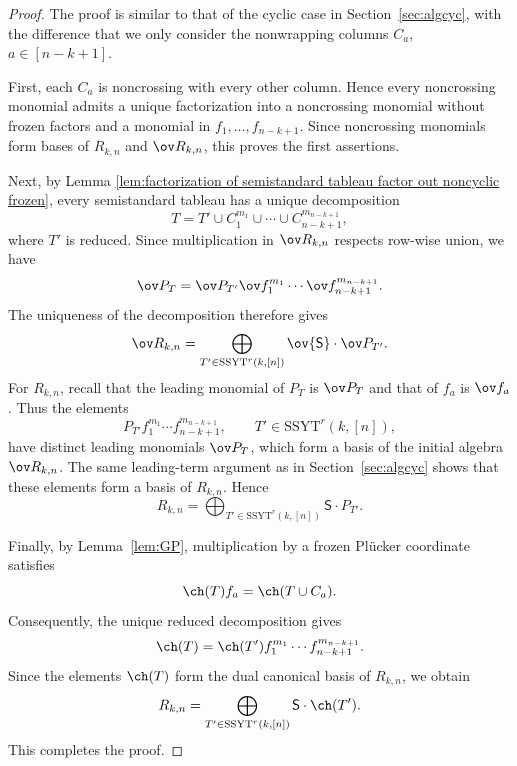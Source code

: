 \documentclass[11pt]{amsart}
\numberwithin{equation}{section}
\newcommand{\SSYT}{\mathrm{SSYT}}
\begin{document}
\begin{proof}
The proof is similar to that of the cyclic case in
Section~\ref{sec:algcyc}, with the difference that we only
consider the nonwrapping columns $C_a$, $a\in[n-k+1]$.

First, each $C_a$ is noncrossing with every other column.
Hence every noncrossing monomial admits a unique factorization
into a noncrossing monomial without frozen factors and a
monomial in $f_1,\ldots,f_{n-k+1}$.
Since noncrossing monomials form bases of $R_{k,n}$ and
$\ov R_{k,n}$, this proves the first assertions.

Next, by Lemma \ref{lem:factorization of semistandard tableau factor out noncyclic frozen}, every semistandard tableau
has a unique decomposition
\[
T=T'\cup C_1^{m_1}\cup\cdots\cup
C_{n-k+1}^{m_{n-k+1}},
\]
where $T'$ is reduced. Since multiplication in $\ov R_{k,n}$ respects row-wise
union, we have
\[
\ov P_T=\ov P_{T'}\ov f_1^{m_1}\cdots
\ov f_{n-k+1}^{m_{n-k+1}}.
\]
The uniqueness of the decomposition therefore gives
\[
\ov R_{k,n}
=\bigoplus_{T'\in\SSYT^r(k,[n])}
\ov{\mathsf S}\cdot\ov P_{T'}.
\]
For $R_{k,n}$, recall that the leading monomial of $P_T$
is $\ov P_T$ and that of $f_a$ is $\ov f_a$.
Thus the elements
\[
P_{T'}f_1^{m_1}\cdots f_{n-k+1}^{m_{n-k+1}},
\qquad T'\in\SSYT^r(k,[n]),
\]
have distinct leading monomials $\ov P_T$, which form
a basis of the initial algebra $\ov R_{k,n}$.
The same leading-term argument as in
Section~\ref{sec:algcyc} shows that these elements
form a basis of $R_{k,n}$. Hence
\[
R_{k,n}
=\bigoplus_{T'\in\SSYT^r(k,[n])}
{\mathsf S}\cdot P_{T'}.
\]

Finally, by Lemma~\ref{lem:GP}, multiplication by
a frozen Pl\"ucker coordinate satisfies
\[
\ch(T)f_a=\ch(T\cup C_a).
\]
Consequently, the unique reduced decomposition gives
\[
\ch(T)=\ch(T')f_1^{m_1}\cdots
f_{n-k+1}^{m_{n-k+1}}.
\]
Since the elements $\ch(T)$ form the dual canonical
basis of $R_{k,n}$, we obtain
\[
R_{k,n}
=\bigoplus_{T'\in\SSYT^r(k,[n])}
{\mathsf S}\cdot\ch(T').
\]
This completes the proof.
\end{proof}
\end{document}
